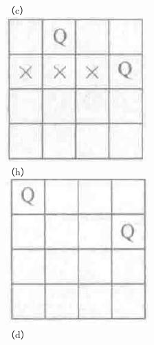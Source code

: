 \documentclass[10pt]{article}
\begin{document}
（c）\\
\includegraphics[max width=\textwidth, center]{2025_06_06_704745ea57b15b2333e5g-135(3)}\\
（h）\\
\includegraphics[max width=\textwidth, center]{2025_06_06_704745ea57b15b2333e5g-135(5)}\\
（d）
\end{document}
